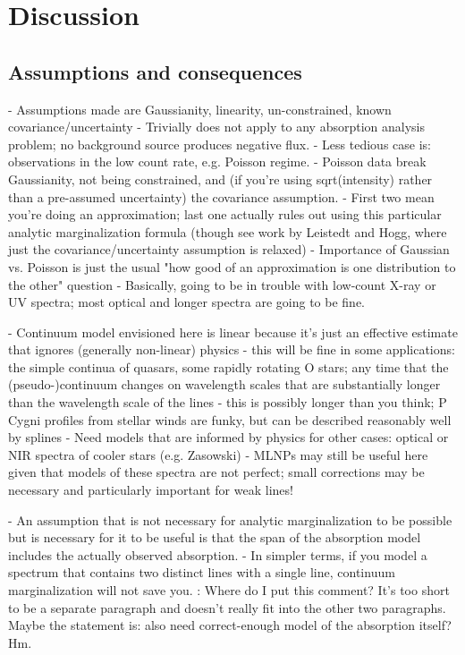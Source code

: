 \documentclass[manuscript]{aastex62}
\begin{document}
\section{Discussion}
\label{sec:discussion}
\subsection{Assumptions and consequences}
- Assumptions made are Gaussianity, linearity, un-constrained, known covariance/uncertainty
- Trivially does not apply to any absorption analysis problem; no background source produces negative flux.
- Less tedious case is: observations in the low count rate, e.g. Poisson regime.
- Poisson data break Gaussianity, not being constrained, and (if you're using sqrt(intensity) rather than a pre-assumed uncertainty) the covariance assumption.
- First two mean you're doing an approximation; last one actually rules out using this particular analytic marginalization formula (though see work by Leistedt and Hogg, where just the covariance/uncertainty assumption is relaxed)
- Importance of Gaussian vs. Poisson is just the usual "how good of an approximation is one distribution to the other" question
- Basically, going to be in trouble with low-count X-ray or UV spectra; most optical and longer spectra are going to be fine.

- Continuum model envisioned here is linear because it's just an effective estimate that ignores (generally non-linear) physics
- this will be fine in some applications: the simple continua of quasars, some rapidly rotating O stars; any time that the (pseudo-)continuum changes on wavelength scales that are substantially longer than the wavelength scale of the lines
- this is possibly longer than you think; P Cygni profiles from stellar winds are funky, but can be described reasonably well by splines
- Need models that are informed by physics for other cases: optical or NIR spectra of cooler stars (e.g. Zasowski)
- MLNPs may still be useful here given that models of these spectra are not perfect; small corrections may be necessary and particularly important for weak lines!

- An assumption that is not necessary for analytic marginalization to be possible but is necessary for it to be useful is that the span of the absorption model includes the actually observed absorption.
- In simpler terms, if you model a spectrum that contains two distinct lines with a single line, continuum marginalization will not save you.
: Where do I put this comment? It's too short to be a separate paragraph and doesn't really fit into the other two paragraphs. Maybe the statement is: also need correct-enough model of the absorption itself? Hm.
\end{document}
